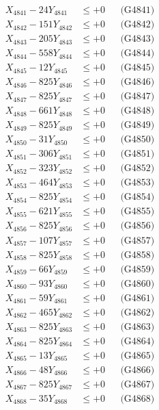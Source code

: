 \documentclass[a4paper,10pt]{article}
\begin{document}
{\begin{align}
\allowbreak
X_{4841} - 24Y_{4841} &\leq +0 && \text{(G4841)} \\
X_{4842} - 151Y_{4842} &\leq +0 && \text{(G4842)} \\
X_{4843} - 205Y_{4843} &\leq +0 && \text{(G4843)} \\
X_{4844} - 558Y_{4844} &\leq +0 && \text{(G4844)} \\
X_{4845} - 12Y_{4845} &\leq +0 && \text{(G4845)} \\
X_{4846} - 825Y_{4846} &\leq +0 && \text{(G4846)} \\
X_{4847} - 825Y_{4847} &\leq +0 && \text{(G4847)} \\
X_{4848} - 661Y_{4848} &\leq +0 && \text{(G4848)} \\
X_{4849} - 825Y_{4849} &\leq +0 && \text{(G4849)} \\
X_{4850} - 31Y_{4850} &\leq +0 && \text{(G4850)} \\
\allowbreak
X_{4851} - 306Y_{4851} &\leq +0 && \text{(G4851)} \\
X_{4852} - 323Y_{4852} &\leq +0 && \text{(G4852)} \\
X_{4853} - 464Y_{4853} &\leq +0 && \text{(G4853)} \\
X_{4854} - 825Y_{4854} &\leq +0 && \text{(G4854)} \\
X_{4855} - 621Y_{4855} &\leq +0 && \text{(G4855)} \\
X_{4856} - 825Y_{4856} &\leq +0 && \text{(G4856)} \\
X_{4857} - 107Y_{4857} &\leq +0 && \text{(G4857)} \\
X_{4858} - 825Y_{4858} &\leq +0 && \text{(G4858)} \\
X_{4859} - 66Y_{4859} &\leq +0 && \text{(G4859)} \\
X_{4860} - 93Y_{4860} &\leq +0 && \text{(G4860)} \\
\allowbreak
X_{4861} - 59Y_{4861} &\leq +0 && \text{(G4861)} \\
X_{4862} - 465Y_{4862} &\leq +0 && \text{(G4862)} \\
X_{4863} - 825Y_{4863} &\leq +0 && \text{(G4863)} \\
X_{4864} - 825Y_{4864} &\leq +0 && \text{(G4864)} \\
X_{4865} - 13Y_{4865} &\leq +0 && \text{(G4865)} \\
X_{4866} - 48Y_{4866} &\leq +0 && \text{(G4866)} \\
X_{4867} - 825Y_{4867} &\leq +0 && \text{(G4867)} \\
X_{4868} - 35Y_{4868} &\leq +0 && \text{(G4868)} \\

\end{align}}
\end{document}
